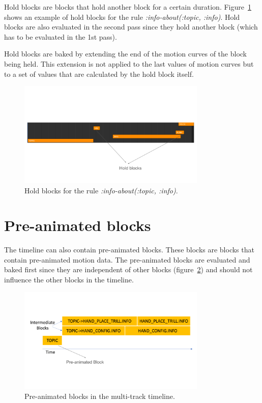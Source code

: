 \documentclass[../../main.tex]{subfiles}
\begin{document}
Hold blocks are blocks that hold another block for a certain duration. Figure~\ref{fig:hold_blocks} shows an example of hold blocks for the rule \emph{:info-about(:topic, :info)}. Hold blocks are also evaluated in the second pass since they hold another block (which has to be evaluated in the 1st pass).

Hold blocks are baked by extending the end of the motion curves of the block being held. This extension is not applied to the last values of motion curves but to a set of values that are calculated by the hold block itself.

\begin{figure}
    \centering
    \includegraphics[width=0.8\textwidth]{chapters/multi_track/images/hold_blocks.png}
    \caption{Hold blocks for the rule \emph{:info-about(:topic, :info)}.}
    \label{fig:hold_blocks}
\end{figure}

\section{Pre-animated blocks}
\label{ch:multi_track:preanim_blocks}

The timeline can also contain pre-animated blocks. These blocks are blocks that contain pre-animated motion data. The pre-animated blocks are evaluated and baked first since they are independent of other blocks (figure~\ref{fig:preanim_blocks}) and should not influence the other blocks in the timeline.

\begin{figure}[h]
    \centering
    \includegraphics[width=0.8\textwidth]{chapters/multi_track/images/preanim_blocks.png}
    \caption{Pre-animated blocks in the multi-track timeline.}
    \label{fig:preanim_blocks}
\end{figure}
\end{document}

